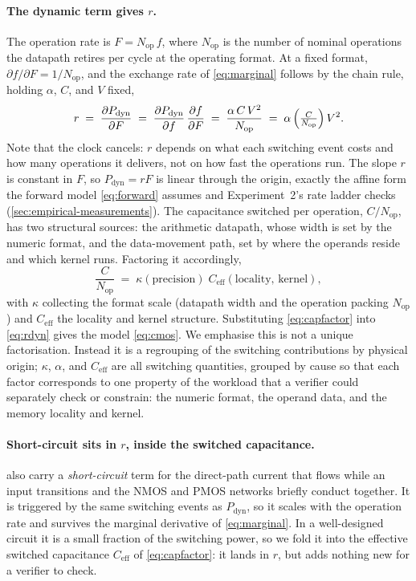 \documentclass{article}
\theoremstyle{plain}
\theoremstyle{definition}
\theoremstyle{remark}
\begin{document}
\paragraph{The dynamic term gives $r$.}
The operation rate is $F = N_{\mathrm{op}}\,f$, where $N_{\mathrm{op}}$ is
the number of nominal operations the datapath retires per cycle at the operating format. At a fixed
format,
$\partial f/\partial F = 1/N_{\mathrm{op}}$, and the exchange rate of
\cref{eq:marginal} follows by the chain rule, holding $\alpha$, $C$, and $V$
fixed,
\begin{equation}
	r \;=\; \frac{\partial P_{\mathrm{dyn}}}{\partial F}
	\;=\; \frac{\partial P_{\mathrm{dyn}}}{\partial f}\,\frac{\partial f}{\partial F}
	\;=\; \frac{\alpha\, C\, V^2}{N_{\mathrm{op}}}
	\;=\; \alpha\,\Bigl(\tfrac{C}{N_{\mathrm{op}}}\Bigr)\,V^2 .
	\label{eq:rdyn}
\end{equation}
Note that the clock cancels: $r$ depends on what each switching event costs
and how many operations it delivers, not on how fast the operations run. The
slope $r$ is constant in $F$, so $P_{\mathrm{dyn}} = rF$ is linear through the
origin, exactly the affine form the forward model \cref{eq:forward} assumes
and Experiment~2's rate ladder checks (\cref{sec:empirical-measurements}). The capacitance switched
per operation, $C/N_{\mathrm{op}}$, has two structural sources: the arithmetic
datapath, whose width is set by the numeric format, and the data-movement
path, set by where the operands reside and which kernel runs. Factoring it
accordingly,
\begin{equation}
	\frac{C}{N_{\mathrm{op}}} \;=\; \kappa(\text{precision})\;C_{\mathrm{eff}}(\text{locality},\,\text{kernel}),
	\label{eq:capfactor}
\end{equation}
with $\kappa$ collecting the format scale (datapath width and the operation
packing $N_{\mathrm{op}}$) and $C_{\mathrm{eff}}$ the locality and kernel
structure. Substituting \cref{eq:capfactor} into \cref{eq:rdyn} gives the
model \cref{eq:cmos}. We emphasise this is not a unique factorisation.
Instead it is a regrouping of the switching contributions by physical origin;
$\kappa$, $\alpha$, and $C_{\mathrm{eff}}$ are all switching quantities,
grouped by cause so that each factor corresponds to one property of the
workload that a verifier could separately check or constrain: the numeric
format, the operand data, and the memory locality and kernel.

\paragraph{Short-circuit sits in $r$, inside the switched capacitance.}
\citet{chandrakasan1992lowpower} also carry a \emph{short-circuit} term for
the direct-path current that flows while an input transitions and the NMOS
and PMOS networks briefly conduct together. It is triggered by the same
switching events as $P_{\mathrm{dyn}}$, so it scales with the operation rate and
survives the marginal derivative of \cref{eq:marginal}. In a well-designed
circuit it is a small fraction of the switching power, so we fold it into
the effective switched capacitance $C_{\mathrm{eff}}$ of \cref{eq:capfactor}:
it lands in $r$, but adds nothing new for a verifier to check.
\end{document}
